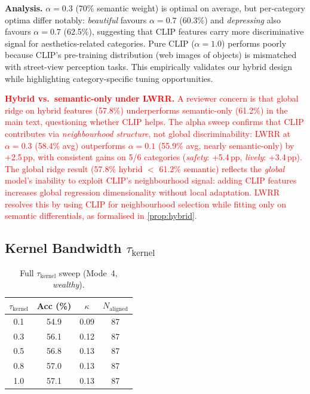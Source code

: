\documentclass[runningheads]{llncs}
\begin{document}
\noindent\textbf{Analysis.}
$\alpha{=}0.3$ (70\% semantic weight) is optimal on average, but per-category optima differ notably: \emph{beautiful} favours $\alpha{=}0.7$ (60.3\%) and \emph{depressing} also favours $\alpha{=}0.7$ (62.5\%), suggesting that CLIP features carry more discriminative signal for aesthetics-related categories.
Pure CLIP ($\alpha{=}1.0$) performs poorly because CLIP's pre-training distribution (web images of objects) is mismatched with street-view perception tasks.
This empirically validates our hybrid design while highlighting category-specific tuning opportunities.

\textcolor{red}{\smallskip\noindent\textbf{Hybrid vs.\ semantic-only under LWRR.}
A reviewer concern is that global ridge on hybrid features (57.8\%) underperforms semantic-only (61.2\%) in the main text, questioning whether CLIP helps.
The alpha sweep confirms that CLIP contributes via \emph{neighbourhood structure}, not global discriminability: LWRR at $\alpha{=}0.3$ (58.4\% avg) outperforms $\alpha{=}0.1$ (55.9\% avg, nearly semantic-only) by +2.5\,pp, with consistent gains on 5/6 categories (\emph{safety}: +5.4\,pp, \emph{lively}: +3.4\,pp).
The global ridge result (57.8\% hybrid $<$ 61.2\% semantic) reflects the \emph{global} model's inability to exploit CLIP's neighbourhood signal: adding CLIP features increases global regression dimensionality without local adaptation.
LWRR resolves this by using CLIP for neighbourhood selection while fitting only on semantic differentials, as formalised in \cref{prop:hybrid}.}

\subsection{Kernel Bandwidth $\tau_{\mathrm{kernel}}$}

\begin{table}[H]
\centering
\caption{Full $\tau_{\mathrm{kernel}}$ sweep (Mode~4, \emph{wealthy}).}
\label{tab:tau_sweep}
\small
\begin{tabular}{cccc}
\toprule
$\tau_{\mathrm{kernel}}$ & Acc (\%) & $\kappa$ & $N_{\mathrm{aligned}}$ \\
\midrule
0.1 & 54.9 & 0.09 & 87 \\
0.3 & 56.1 & 0.12 & 87 \\
0.5 & 56.8 & 0.13 & 87 \\
0.8 & 57.0 & 0.13 & 87 \\
1.0 & 57.1 & 0.13 & 87 \\
\bottomrule
\end{tabular}
\end{table}
\end{document}
